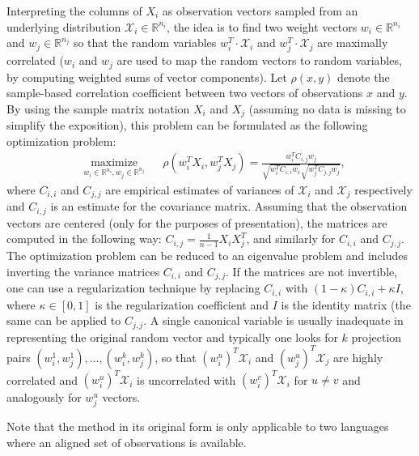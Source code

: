 \documentclass[twoside,11pt]{article}
\newcommand{\RR}{\mathbb{R}}
\begin{document}
Interpreting the columns of $X_i$ as observation vectors sampled from an underlying distribution $\mathcal{X}_i \in \RR^{n_i}$, the idea is to find two weight vectors $w_i \in \RR^{n_i}$ and $w_j \in \RR^{n_j}$ so that the random variables $w_i^T \cdot \mathcal{X}_i$ and $w_j^T \cdot \mathcal{X}_j$ are maximally correlated ($w_i$ and $w_j$ are used to map the random vectors to random variables, by computing weighted sums of vector components). Let $\rho(x,y)$ denote the sample-based correlation coefficient between two vectors of observations $x$ and $y$. By using the sample matrix notation $X_i$ and $X_j$ (assuming no data is missing to simplify the exposition), this problem can be formulated as the following optimization problem:
\begin{equation*}
\begin{aligned}
& \underset{w_i \in \RR^{n_i}, w_j \in \RR^{n_j}}{\text{maximize}}
& & \rho(w_i^T X_i , w_j^T X_j) = \frac{w_i^T C_{i,j} w_j}{\sqrt{w_i^T C_{i,i} w_i} \sqrt{w_j^T C_{j,j} w_j}},
\end{aligned}
\end{equation*}
where $C_{i,i}$ and $C_{j,j}$ are empirical estimates of variances of $\mathcal{X}_i$ and $\mathcal{X}_j$ respectively and $C_{i,j}$ is an estimate for the covariance matrix. Assuming that the observation vectors are centered (only for the purposes of presentation), the matrices are computed in the following way: $C_{i,j} = \frac{1}{n-1}X_i X_j^T$, and similarly for $C_{i,i}$ and $C_{j,j}$.
The optimization problem can be reduced to an eigenvalue problem and includes inverting the variance matrices $C_{i,i}$ and $C_{j,j}$. If the matrices are not invertible, one can use a regularization technique by replacing $C_{i,i}$ with $(1- \kappa)C_{i,i} + \kappa I$, where $\kappa \in [0,1]$ is the regularization coefficient and $I$ is the identity matrix (the same can be applied to $C_{j,j}$.
A single canonical variable is usually inadequate in representing the original random vector and typically one looks for $k$ projection pairs $(w_i^1, w_j^1),\ldots,(w_i^k, w_j^k)$, so that $(w_i^{u})^T \mathcal{X}_i$ and $(w_j^{u})^T \mathcal{X}_j$ are highly correlated and $(w_i^{u})^T \mathcal{X}_i$ is uncorrelated with $(w_i^{v})^T \mathcal{X}_i$  for $u \neq v$ and analogously for $w_j^u$ vectors.

Note that the method in its original form is only applicable to two languages where an aligned set of observations is available.
\end{document}
